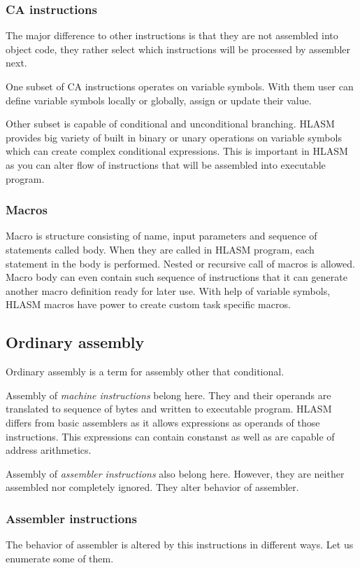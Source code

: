 \subsubsection{CA instructions}

The major difference to other instructions is that they are not assembled into object code, they rather select which instructions will be processed by assembler next.

One subset of CA instructions operates on variable symbols. With them user can define variable symbols locally or globally, assign or update their value.

Other subset is capable of conditional and unconditional branching. HL\-ASM provides big variety of built in binary or unary operations on variable symbols which can create complex conditional expressions. This is important in HLASM as you can alter flow of instructions that will be assembled into executable program.

\subsubsection{Macros}
Macro is structure consisting of name, input parameters and sequence of statements called body. When they are called in HLASM program, each statement in the body is performed. Nested or recursive call of macros is allowed. Macro body can even contain such sequence of instructions that it can generate another macro definition ready for later use. With help of variable symbols, HLASM macros have power to create custom task specific macros.

\subsection{Ordinary assembly}

Ordinary assembly is a term for assembly other that conditional. 

Assembly of \textit{machine instructions} belong here. They and their operands are translated to sequence of bytes and written to executable program. HL\-ASM differs from basic assemblers as it allows expressions as operands of those instructions. This expressions can contain constanst as well as are capable of address arithmetics.

Assembly of \textit{assembler instructions} also belong here. However, they are neither assembled nor completely ignored. They alter behavior of assembler.

\subsubsection{Assembler instructions}
The behavior of assembler is altered by this instructions in different ways. Let us enumerate some of them.
 
